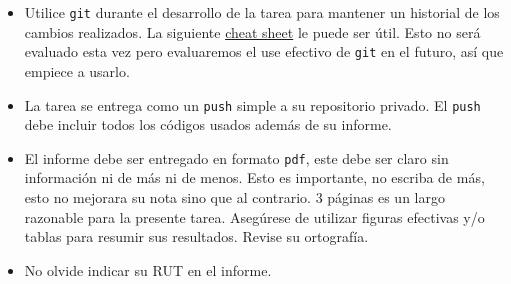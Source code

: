\documentclass[letter, 11pt]{article}
\begin{document}
\vspace{1em}
\begin{itemize}

    \item Utilice \texttt{git} durante el desarrollo de la tarea para mantener
        un historial de los cambios realizados. La siguiente
        \href{https://education.github.com/git-cheat-sheet-education.pdf}{cheat
        sheet} le puede ser útil. Esto no será evaluado esta vez pero
        evaluaremos el use efectivo de \texttt{git} en el futuro, así que
        empiece a usarlo.

    \item La tarea se entrega como un \texttt{push} simple a su repositorio
        privado. El \texttt{push} debe incluir todos los códigos usados además
        de su informe.

    \item El informe debe ser entregado en formato \texttt{pdf}, este debe ser
      claro sin información ni de más ni de menos. Esto es importante, no
      escriba de más, esto no mejorara su nota sino que al contrario. 3 páginas
      es un largo razonable para la presente tarea.  Asegúrese de utilizar
      figuras efectivas y/o tablas para resumir sus resultados. Revise su
      ortografía.

    \item No olvide indicar su RUT en el informe.

\end{itemize}
\end{document}

